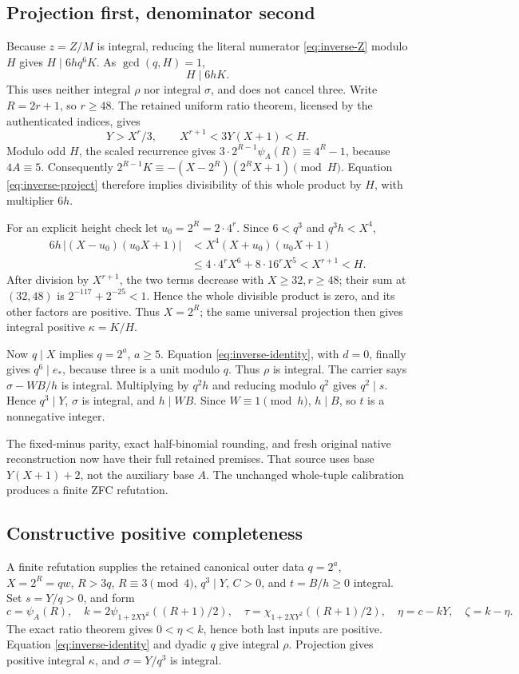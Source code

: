 \subsection{Projection first, denominator second}
Because \(z=Z/M\) is integral, reducing the literal numerator
\eqref{eq:inverse-Z} modulo \(H\) gives \(H\mid6hq^6K\).
As \(\gcd(q,H)=1\),
\begin{equation}
 H\mid6hK.\label{eq:inverse-project}
\end{equation}
This uses neither integral \(\rho\) nor integral \(\sigma\), and does
not cancel three.  Write \(R=2r+1\), so \(r\ge48\).
The retained uniform ratio theorem, licensed by the authenticated
indices, gives
\[
 Y>X^r/3,\qquad X^{r+1}<3Y(X+1)<H.
\]
Modulo odd \(H\), the scaled recurrence gives
\(3\cdot2^{R-1}\psi_A(R)\equiv4^R-1\), because \(4A\equiv5\).
Consequently \(2^{R-1}K\equiv-(X-2^R)(2^RX+1)\pmod H\).
Equation \eqref{eq:inverse-project} therefore implies divisibility
of this whole product by \(H\), with multiplier \(6h\).

For an explicit height check let \(u_0=2^R=2\cdot4^r\).
Since \(6<q^3\) and \(q^3h<X^4\),
\begin{align*}
 6h\,|(X-u_0)(u_0X+1)|
 &<X^4(X+u_0)(u_0X+1)\\
 &\le4\cdot4^rX^6+8\cdot16^rX^5<X^{r+1}<H.
\end{align*}
After division by \(X^{r+1}\), the two terms decrease with
\(X\ge32,r\ge48\); their sum at \((32,48)\) is
\(2^{-117}+2^{-25}<1\).  Hence the whole divisible product is zero,
and its other factors are positive.  Thus \(X=2^R\); the same universal
projection then gives integral positive \(\kappa=K/H\).

Now \(q\mid X\) implies \(q=2^a\), \(a\ge5\).
Equation \eqref{eq:inverse-identity}, with \(d=0\), finally gives
\(q^6\mid e_*\), because three is a unit modulo \(q\).
Thus \(\rho\) is integral.  The carrier says
\(\sigma-WB/h\) is integral.  Multiplying by \(q^2h\) and reducing
modulo \(q^2\) gives \(q^2\mid s\).  Hence \(q^3\mid Y\),
\(\sigma\) is integral, and \(h\mid WB\).  Since \(W\equiv1\pmod h\),
\(h\mid B\), so \(t\) is a nonnegative integer.

The fixed-minus parity, exact half-binomial rounding, and fresh original
native reconstruction now have their full retained premises.
That source uses base \(Y(X+1)+2\), not the auxiliary base \(A\).
The unchanged whole-tuple calibration produces a finite ZFC refutation.

\subsection{Constructive positive completeness}
A finite refutation supplies the retained canonical outer data
\(q=2^a\), \(X=2^R=qw\), \(R>3q\), \(R\equiv3\pmod4\),
\(q^3\mid Y\), \(C>0\), and \(t=B/h\ge0\) integral.
Set \(s=Y/q>0\), and form
\[
 c=\psi_A(R),\quad k=2\psi_{1+2XY^2}((R+1)/2),\quad
 \tau=\chi_{1+2XY^2}((R+1)/2),\quad
 \eta=c-kY,\quad\zeta=k-\eta.
\]
The exact ratio theorem gives \(0<\eta<k\), hence both last inputs
are positive.  Equation \eqref{eq:inverse-identity} and dyadic \(q\)
give integral \(\rho\).  Projection gives positive integral \(\kappa\),
and \(\sigma=Y/q^3\) is integral.


